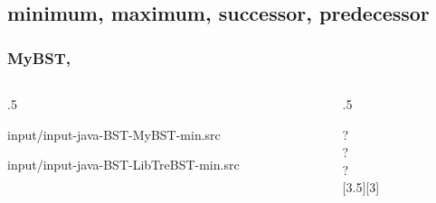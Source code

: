\documentclass[10pt]{beamer}
\begin{document}
\subsection{minimum, maximum, successor, predecessor}
\begin{frame}[t]\frametitle{MyBST, }
	\vspace{-0.3cm}
	\begin{columns}[T] %
	\begin{column}{.5\linewidth} %
		{\tiny 
			
				{input/input-java-BST-MyBST-min.src}
		} %
		{\tiny 
			
				{input/input-java-BST-LibTreBST-min.src}
		} %
	\end{column} %
	\begin{column}{.5\linewidth} %
		{\tiny 
		\begin{example}
		\begin{center}
			
		\end{center}
		{\scriptsize 		
			 ?\\
			 ?\\				
			 ?\\				
		} %
		\end{example}
		} %
	\end{column} %
	\end{columns} %

\end{frame}
\end{document}
